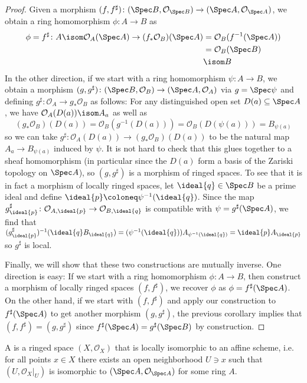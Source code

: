 \documentclass[wip, algebra]{bsteffan-lecturenotes}
\newcommand{\cO}{\mathcal{O}}
\begin{document}
\begin{proof}
	Given a morphism $(f, f^\sharp)\colon (\Spec B, \cO_{\Spec B}) \to (\Spec A, \cO_{\Spec A})$, we obtain a ring homomorphism $\phi\colon A \to B$ as
	\begin{align*}
		\phi = f^\sharp\colon A \isom \cO_A(\Spec A) \to (f_* \cO_B)(\Spec A) &= \cO_B(f^{-1}(\Spec A)) \\
																			  &= \cO_B(\Spec B) \\
																			  &\isom B
	\end{align*}
	In the other direction, if we start with a ring homomorphism $\psi\colon A \to B$, we obtain a morphism $(g, g^\sharp)\colon (\Spec B, \cO_{B}) \to (\Spec A, \cO_{A})$ via $g = \Spec \psi$ and defining $g^\sharp\colon \cO_A \to g_* \cO_B$ as follows: 
	For any distinguished open set $D(a) \subseteq \Spec A$, we have $\cO_A(D(a)) \isom A_a$ as well as 
	\begin{equation*}
		(g_* \cO_B)(D(a)) = \cO_B(g^{-1}(D(a))) = \cO_B(D(\psi(a))) = B_{\psi(a)}
	\end{equation*}
	so we can take $g^\sharp\colon \cO_A(D(a)) \to (g_* \cO_B)(D(a))$ to be the natural map $A_a \to B_{\psi(a)}$ induced by $\psi$.
	It is not hard to check that this glues together to a sheaf homomorphism (in particular since the $D(a)$ form a basis of the Zariski topology on $\Spec A$), so $(g, g^\sharp)$ is a morphism of ringed spaces.
	To see that it is in fact a morphism of locally ringed spaces, let $\ideal{q} \in \Spec B$ be a prime ideal and define $\ideal{p} \coloneq \psi^{-1}(\ideal{q})$.
	Since the map $g^\sharp_{\ideal{p}}\colon \cO_{A, \ideal{p}} \to \cO_{B, \ideal{q}}$ is compatible with $\psi = g^\sharp(\Spec A)$, we find that $(g^\sharp_{\ideal{p}})^{-1}(\ideal{q} B_{\ideal{q}}) = (\psi^{-1}(\ideal{q})) A_{\psi^{-1}(\ideal{q})} = \ideal{p} A_{\ideal{p}}$ so $g^\sharp$ is local.

	Finally, we will show that these two constructions are mutually inverse.
	One direction is easy: 
	If we start with a ring homomorphism $\phi\colon A \to B$, then construct a morphism of locally ringed spaces $(f, f^\sharp)$, we recover $\phi$ as $\phi = f^\sharp(\Spec A)$.
	On the other hand, if we start with $(f, f^\sharp)$ and apply our construction to $f^\sharp(\Spec A)$ to get another morphism $(g, g^\sharp)$, the previous corollary implies that $(f, f^\sharp) = (g, g^\sharp)$ since $f^\sharp(\Spec A) = g^\sharp(\Spec B)$ by construction.
\end{proof}
\begin{definition}
	A  is a ringed space $(X, \cO_X)$ that is locally isomorphic to an affine scheme, i.e. for all points $x \in X$ there exists an open neighborhood $U \ni x$ such that $(U, \cO_X|_U)$ is isomorphic to $(\Spec A, \cO_{\Spec A})$ for some ring $A$.
\end{definition}
\end{document}
